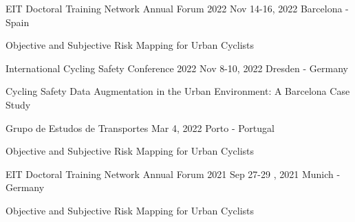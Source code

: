 

\begin{cventries}

\cventrypresentation
	{EIT Doctoral Training Network Annual Forum 2022} %
	{Nov 14-16, 2022} %
	{Barcelona - Spain} %
	{
		\begin{cvpresentationitems} %
			\item {} {Objective and Subjective Risk Mapping for Urban Cyclists}
		\end{cvpresentationitems}
	}

  \cventrypresentation
	{International Cycling Safety Conference 2022} %
	{Nov 8-10, 2022} %
	{Dresden - Germany} %
	{
		\begin{cvpresentationitems} %
			\item {} {Cycling Safety Data Augmentation 
			in the Urban Environment: A Barcelona Case Study}
		\end{cvpresentationitems}
	}

  \cventrypresentation
    {Grupo de Estudos de Transportes} %
    {Mar 4, 2022} %
    {Porto - Portugal} %
    {
      \begin{cvpresentationitems} %
        \item {} {Objective and Subjective Risk Mapping for Urban Cyclists}
      \end{cvpresentationitems}
    }


  \cventrypresentation
    {EIT Doctoral Training Network Annual Forum 2021} %
    {Sep 27-29 , 2021} %
    {Munich - Germany} %
    {
      \begin{cvpresentationitems} %
        \item {} {Objective and Subjective Risk Mapping for Urban Cyclists}
      \end{cvpresentationitems}
    }


\end{cventries}
